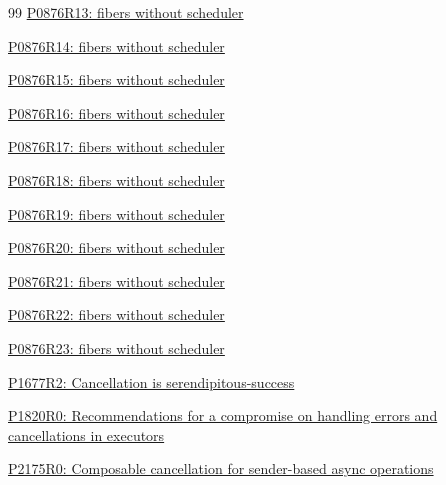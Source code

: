 \begin{thebibliography}{99}
        \href{https://www.open-std.org/jtc1/sc22/wg21/docs/papers/2023/p0876r13.pdf}
        {P0876R13: fibers without scheduler}

        \href{https://www.open-std.org/jtc1/sc22/wg21/docs/papers/2023/p0876r14.pdf}
        {P0876R14: fibers without scheduler}

        \href{https://www.open-std.org/jtc1/sc22/wg21/docs/papers/2024/p0876r15.pdf}
        {P0876R15: fibers without scheduler}

        \href{https://www.open-std.org/jtc1/sc22/wg21/docs/papers/2024/p0876r16.pdf}
        {P0876R16: fibers without scheduler}

        \href{https://www.open-std.org/jtc1/sc22/wg21/docs/papers/2024/p0876r17.pdf}
        {P0876R17: fibers without scheduler}

        \href{https://www.open-std.org/jtc1/sc22/wg21/docs/papers/2024/p0876r18.pdf}
        {P0876R18: fibers without scheduler}

        \href{https://www.open-std.org/jtc1/sc22/wg21/docs/papers/2025/p0876r19.pdf}
        {P0876R19: fibers without scheduler}

        \href{https://www.open-std.org/jtc1/sc22/wg21/docs/papers/2025/p0876r20.pdf}
        {P0876R20: fibers without scheduler}

        \href{https://www.open-std.org/jtc1/sc22/wg21/docs/papers/2025/p0876r21.pdf}
        {P0876R21: fibers without scheduler}

        \href{https://www.open-std.org/jtc1/sc22/wg21/docs/papers/2026/p0876r22.pdf}
        {P0876R22: fibers without scheduler}

        \href{https://www.open-std.org/jtc1/sc22/wg21/docs/papers/2026/p0876r23.pdf}
        {P0876R23: fibers without scheduler}

        \href{https://www.open-std.org/jtc1/sc22/wg21/docs/papers/2019/p1677r2.pdf}
        {P1677R2: Cancellation is serendipitous-success}

        \href{https://www.open-std.org/jtc1/sc22/wg21/docs/papers/2019/p1820r0.html}
        {P1820R0: Recommendations for a compromise on handling errors and cancellations in executors}

        \href{https://www.open-std.org/jtc1/sc22/wg21/docs/papers/2020/p2175r0.html}
        {P2175R0: Composable cancellation for sender-based async operations}


\end{thebibliography}
